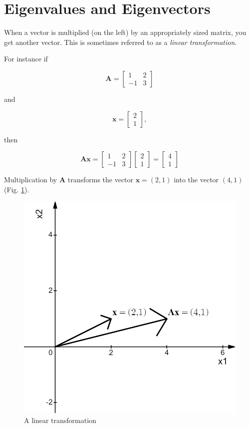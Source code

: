 \documentclass[
]{book}
\theoremstyle{definition}
\theoremstyle{definition}
\theoremstyle{definition}
\theoremstyle{definition}
\theoremstyle{remark}
\begin{document}
\section{Eigenvalues and Eigenvectors}\label{eigenvalues-and-eigenvectors-1}

When a vector is multiplied (on the left) by an appropriately sized matrix, you get another vector. This is sometimes referred to as a \emph{linear transformation}.

For instance if

\[\mathbf{A}=\begin{bmatrix} 1 & 2 \\-1 & 3\end{bmatrix}\]

and

\[\mathbf{x}=\begin{bmatrix} 2\\1\end{bmatrix},\]

then

\[\mathbf{A}\mathbf{x}=\begin{bmatrix} 1 & 2 \\-1 & 3 \end{bmatrix}\begin{bmatrix} 2\\1\end{bmatrix}=\begin{bmatrix}4\\1\end{bmatrix}\]

Multiplication by \(\mathbf{A}\) transforms the vector \(\mathbf{x}=(2,1)\) into the vector \((4,1)\) (Fig. \ref{fig:lt1}).

\begin{figure}

{\centering \includegraphics[width=0.5\linewidth]{images/lt} 

}

\caption{A linear transformation}\label{fig:lt1}
\end{figure}
\end{document}

